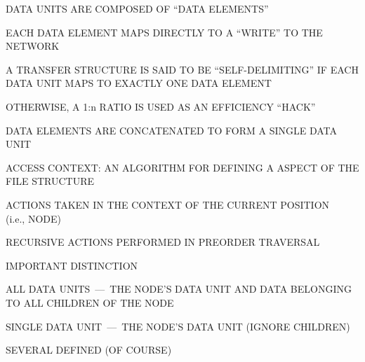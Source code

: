 \begin{bwslide}

\begin{nrtc}
\item	DATA UNITS ARE COMPOSED OF ``DATA ELEMENTS''

\item	EACH DATA ELEMENT MAPS DIRECTLY TO A ``WRITE'' TO THE NETWORK

\item	A TRANSFER STRUCTURE IS SAID TO BE ``SELF-DELIMITING'' IF EACH
	DATA UNIT MAPS TO EXACTLY ONE DATA ELEMENT

\item	OTHERWISE, A 1:n RATIO IS USED AS AN EFFICIENCY ``HACK''
    \begin{nrtc}
    \item	DATA ELEMENTS ARE CONCATENATED TO FORM A SINGLE DATA UNIT
    \end{nrtc}
\end{nrtc}
\end{bwslide}


\begin{bwslide}

\begin{nrtc}
\item	ACCESS CONTEXT:
	AN ALGORITHM FOR DEFINING A ASPECT OF THE FILE STRUCTURE

\item	ACTIONS TAKEN IN THE CONTEXT OF THE CURRENT POSITION\\ (i.e., NODE)

\item	RECURSIVE ACTIONS PERFORMED IN PREORDER TRAVERSAL

\item	IMPORTANT DISTINCTION
    \begin{nrtc}
    \item	ALL DATA UNITS~---~THE NODE'S DATA UNIT AND DATA BELONGING
		TO ALL CHILDREN OF THE NODE

    \item	SINGLE DATA UNIT~---~THE NODE'S DATA UNIT (IGNORE CHILDREN)
    \end{nrtc}

\item	SEVERAL DEFINED (OF COURSE)
\end{nrtc}
\end{bwslide}




